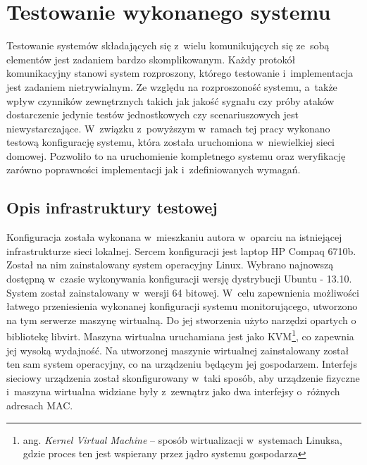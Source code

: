 \chapter{Testowanie wykonanego systemu}
\label{chap:Testy}

Testowanie systemów składających się z~wielu komunikujących się
ze~sobą elementów jest zadaniem bardzo skomplikowanym. Każdy protokół
komunikacyjny stanowi system rozproszony, którego testowanie
i~implementacja jest zadaniem nietrywialnym. Ze względu na
rozproszoność systemu, a~także wpływ czynników zewnętrznych takich jak
jakość sygnału czy próby ataków dostarczenie jedynie testów
jednostkowych czy scenariuszowych jest niewystarczające. W~związku
z~powyższym w~ramach tej pracy wykonano testową konfigurację systemu,
która została uruchomiona w~niewielkiej sieci domowej. Pozwoliło to na
uruchomienie kompletnego systemu oraz weryfikację zarówno poprawności
implementacji jak i~zdefiniowanych wymagań.

\section[Opis infrastruktury][Opis infrastruktury testowej]{Opis infrastruktury testowej}

Konfiguracja została wykonana w~mieszkaniu autora w~oparciu na
istniejącej infrastrukturze sieci lokalnej. Sercem konfiguracji jest
laptop HP Compaq 6710b. Został na nim zainstalowany system operacyjny
Linux. Wybrano najnowszą dostępną w~czasie wykonywania konfiguracji
wersję dystrybucji Ubuntu - 13.10. System został zainstalowany
w~wersji 64 bitowej. W~celu zapewnienia możliwości łatwego
przeniesienia wykonanej konfiguracji systemu monitorującego, utworzono
na tym serwerze maszynę wirtualną. Do jej stworzenia użyto narzędzi
opartych o bibliotekę libvirt. Maszyna wirtualna uruchamiana jest jako
KVM\footnote{ang. {\em Kernel Virtual Machine} -- sposób wirtualizacji
  w~systemach Linuksa, gdzie proces ten jest wspierany przez jądro
  systemu gospodarza}, co zapewnia jej wysoką wydajność. Na utworzonej
maszynie wirtualnej zainstalowany został ten sam system operacyjny, co
na urządzeniu będącym jej gospodarzem. Interfejs sieciowy urządzenia
został skonfigurowany w~taki sposób, aby urządzenie fizyczne i~maszyna
wirtualna widziane były z~zewnątrz jako dwa interfejsy o~różnych
adresach MAC.

